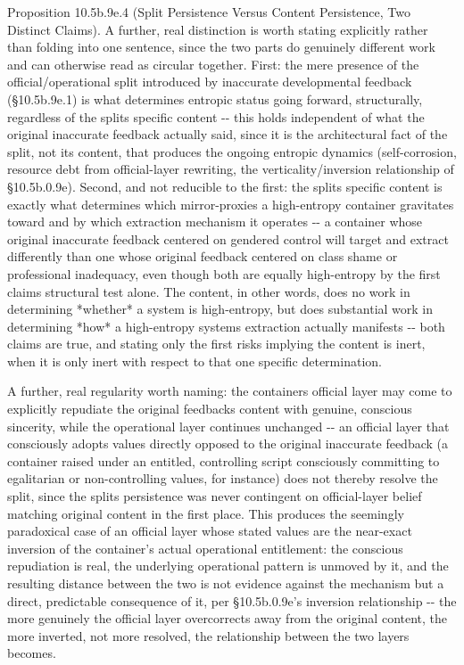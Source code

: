 \documentclass[
]{article}
\begin{document}
Proposition 10.5b.9e.4 (Split Persistence Versus Content Persistence,
Two Distinct Claims). A further, real distinction is worth stating
explicitly rather than folding into one sentence, since the two parts do
genuinely different work and can otherwise read as circular together.
First: the mere presence of the official/operational split introduced by
inaccurate developmental feedback (§10.5b.9e.1) is what determines
entropic status going forward, structurally, regardless of the splits
specific content -\/- this holds independent of what the original
inaccurate feedback actually said, since it is the architectural fact of
the split, not its content, that produces the ongoing entropic dynamics
(self-corrosion, resource debt from official-layer rewriting, the
verticality/inversion relationship of §10.5b.0.9e). Second, and not
reducible to the first: the splits specific content is exactly what
determines which mirror-proxies a high-entropy container gravitates
toward and by which extraction mechanism it operates -\/- a container
whose original inaccurate feedback centered on gendered control will
target and extract differently than one whose original feedback centered
on class shame or professional inadequacy, even though both are equally
high-entropy by the first claims structural test alone. The content, in
other words, does no work in determining *whether* a system is
high-entropy, but does substantial work in determining *how* a
high-entropy systems extraction actually manifests -\/- both claims are
true, and stating only the first risks implying the content is inert,
when it is only inert with respect to that one specific determination.

A further, real regularity worth naming: the containers official layer
may come to explicitly repudiate the original feedbacks content with
genuine, conscious sincerity, while the operational layer continues
unchanged -\/- an official layer that consciously adopts values directly
opposed to the original inaccurate feedback (a container raised under an
entitled, controlling script consciously committing to egalitarian or
non-controlling values, for instance) does not thereby resolve the
split, since the splits persistence was never contingent on
official-layer belief matching original content in the first place. This
produces the seemingly paradoxical case of an official layer whose
stated values are the near-exact inversion of the container's actual
operational entitlement: the conscious repudiation is real, the
underlying operational pattern is unmoved by it, and the resulting
distance between the two is not evidence against the mechanism but a
direct, predictable consequence of it, per §10.5b.0.9e's inversion
relationship -\/- the more genuinely the official layer overcorrects
away from the original content, the more inverted, not more resolved,
the relationship between the two layers becomes.
\end{document}
